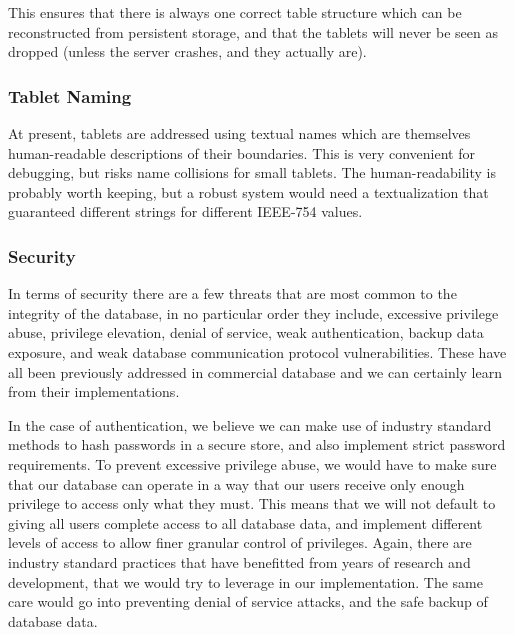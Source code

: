 \documentclass[11pt]{article}
\begin{document}
This ensures that there is always one correct table structure which can be reconstructed from persistent storage, and that the tablets will never be seen as dropped (unless the server crashes, and they actually are).

\subsubsection{Tablet Naming}

At present, tablets are addressed using textual names which are themselves human-readable descriptions of their boundaries.  This is very convenient for debugging, but risks name collisions for small tablets.  The human-readability is probably worth keeping, but a robust system would need a textualization that guaranteed different strings for different IEEE-754 values.

\subsubsection{Security}

In terms of security there are a few threats that are most common to the integrity of the database, in no particular order they include, excessive privilege abuse, privilege elevation, denial of service, weak authentication, backup data exposure, and weak database communication protocol vulnerabilities\cite{security}. These have all been previously addressed in commercial database and we can certainly learn from their implementations. 

In the case of authentication, we believe we can make use of industry standard methods to hash passwords in a secure store, and also implement strict password requirements. To prevent excessive privilege abuse, we would have to make sure that our database can operate in a way that our users receive only enough privilege to access only what they must. This means that we will not default to giving all users complete access to all database data, and implement different levels of access to allow finer granular control of privileges. Again, there are industry standard practices that have benefitted from years of research and development, that we would try to leverage in our implementation. The same care would go into preventing denial of service attacks, and the safe backup of database data.
\end{document}
